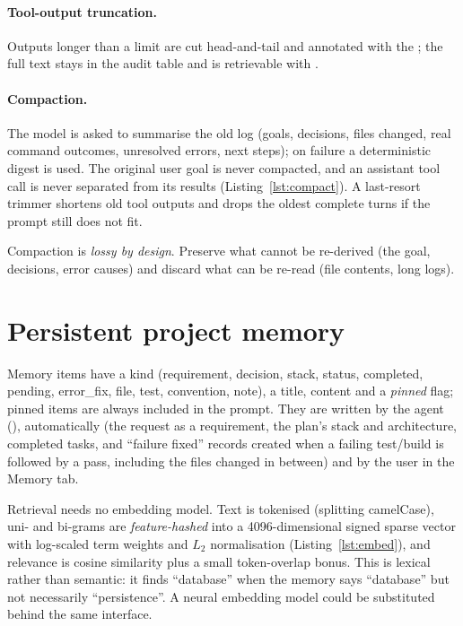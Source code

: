 \documentclass[11pt,a4paper]{article}
\newcommand{\code}[1]{\texttt{\detokenize{#1}}}
\begin{document}
\paragraph{Tool-output truncation.} Outputs longer than a limit are cut head-and-tail and annotated with the \code{tool_run_id}; the full text stays in the audit table and is retrievable with \code{read_full_output}.
\paragraph{Compaction.} The model is asked to summarise the old log (goals, decisions, files changed, real command outcomes, unresolved errors, next steps); on failure a deterministic digest is used. The original user goal is never compacted, and an
assistant tool call is never separated from its results (Listing~\ref{lst:compact}). A last-resort trimmer shortens old tool outputs and drops the oldest complete turns if the prompt still does not fit.


\begin{keyidea}
Compaction is \emph{lossy by design}. Preserve what cannot be re-derived (the goal, decisions, error causes) and discard what can be re-read (file contents, long logs).
\end{keyidea}

\section{Persistent project memory}\label{sec:memory}
Memory items have a kind (requirement, decision, stack, status, completed, pending, error\_fix, file, test, convention, note), a title, content and a \emph{pinned} flag; pinned items are always included in the prompt.
They are written by the agent (\code{remember}), automatically (the request as a requirement, the plan's stack and architecture, completed tasks, and ``failure fixed'' records created when a failing test/build is followed by a pass,
including the files changed in between) and by the user in the Memory tab.

Retrieval needs no embedding model. Text is tokenised (splitting camelCase), uni- and bi-grams are \emph{feature-hashed} \citep{weinberger2009hashing} into a 4096-dimensional signed sparse vector with log-scaled term weights and $L_2$ normalisation (Listing~\ref{lst:embed}),
and relevance is cosine similarity plus a small token-overlap bonus. This is lexical rather than semantic: it finds ``database'' when the memory says ``database'' but not necessarily ``persistence''. A neural embedding model could be substituted behind the same interface.

\end{document}
